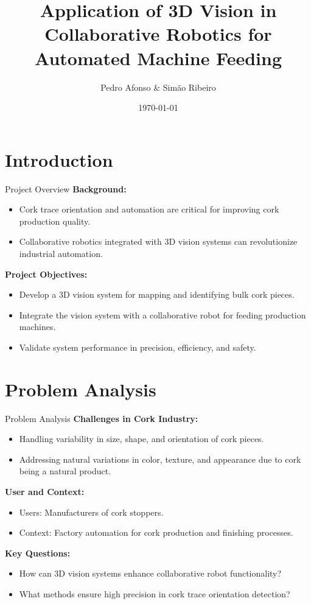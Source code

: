 \documentclass[10pt]{beamer}
\title[3D Vision in Collaborative Robotics]{Application of 3D Vision in Collaborative Robotics for Automated Machine Feeding}
\author{Pedro Afonso \& Simão Ribeiro}
\date{\today}
\institute{Universidade de Aveiro \\ In Collaboration with Azevedos Indústria SA}
\begin{document}
	
	\frame{\titlepage}
	
	\section{Introduction}
	\begin{frame}{Project Overview}
		\textbf{Background:}
		\begin{itemize}
			\item Cork trace orientation and automation are critical for improving cork production quality.
			\item Collaborative robotics integrated with 3D vision systems can revolutionize industrial automation.
		\end{itemize}
		\textbf{Project Objectives:}
		\begin{itemize}
			\item Develop a 3D vision system for mapping and identifying bulk cork pieces.
			\item Integrate the vision system with a collaborative robot for feeding production machines.
			\item Validate system performance in precision, efficiency, and safety.
		\end{itemize}
	\end{frame}
	
	\section{Problem Analysis}
	\begin{frame}{Problem Analysis}
		\textbf{Challenges in Cork Industry:}
		\begin{itemize}
			\item Handling variability in size, shape, and orientation of cork pieces.
			\item Addressing natural variations in color, texture, and appearance due to cork being a natural product.
		\end{itemize}
		\textbf{User and Context:}
		\begin{itemize}
			\item Users: Manufacturers of cork stoppers.
			\item Context: Factory automation for cork production and finishing processes.
		\end{itemize}
		\textbf{Key Questions:}
		\begin{itemize}
			\item How can 3D vision systems enhance collaborative robot functionality?
			\item What methods ensure high precision in cork trace orientation detection?
		\end{itemize}
	\end{frame}
	
\end{document}
